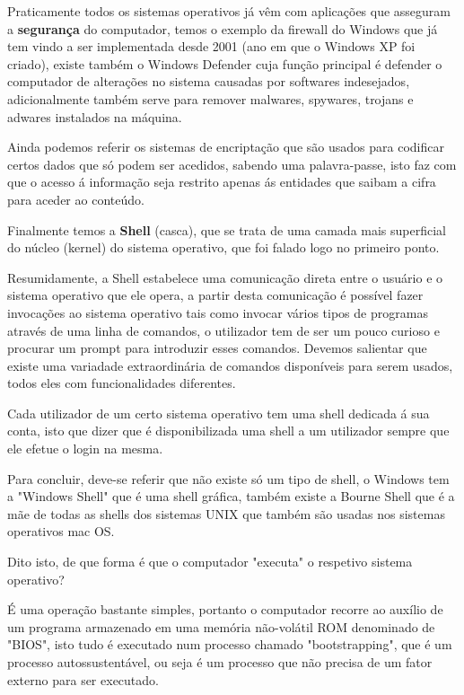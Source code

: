 \documentclass{report}
\begin{document}
\vspace{5mm} %

Praticamente todos os sistemas operativos já vêm com aplicações que asseguram a \textbf{segurança} do computador, temos o exemplo da firewall do Windows que já tem vindo a ser implementada desde 2001 (ano em que o Windows XP foi criado), existe também o Windows Defender cuja função principal é defender o computador de alterações no sistema causadas por softwares indesejados, adicionalmente também serve para remover malwares, spywares, trojans e adwares instalados na máquina.

Ainda podemos referir os sistemas de encriptação que são usados para codificar certos dados que só podem ser acedidos, sabendo uma palavra-passe, isto faz com que o acesso á informação seja restrito apenas ás entidades que saibam a cifra para aceder ao conteúdo.

\vspace{5mm} %

Finalmente temos a \textbf{Shell} (casca), que se trata de uma camada mais superficial do núcleo (kernel) do sistema operativo, que foi falado logo no primeiro ponto.

Resumidamente, a Shell estabelece uma comunicação direta entre o usuário e o sistema operativo que ele opera, a partir desta comunicação é possível fazer invocações ao sistema operativo tais como invocar vários tipos de programas através de uma linha de comandos, o utilizador tem de ser um pouco curioso e procurar um prompt para introduzir esses comandos. Devemos salientar que existe uma variadade extraordinária de comandos disponíveis para serem usados, todos eles com funcionalidades diferentes.

Cada utilizador de um certo sistema operativo tem uma shell dedicada á sua conta, isto que dizer que é disponibilizada uma shell a um utilizador sempre que ele efetue o login na mesma.

Para concluir, deve-se referir que não existe só um tipo de shell, o Windows tem a "Windows Shell" que é uma shell gráfica, também existe a Bourne Shell que é a mãe de todas as shells dos sistemas UNIX que também são usadas nos sistemas operativos mac OS.  

\vspace{5mm} %

Dito isto, de que forma é que o computador "executa" o respetivo sistema operativo?

É uma operação bastante simples, portanto o computador recorre ao auxílio de um programa armazenado em uma memória não-volátil ROM denominado de "BIOS", isto tudo é executado num processo chamado "bootstrapping", que é um processo autossustentável, ou seja é um processo que não precisa de um fator externo para ser executado.
\end{document}
